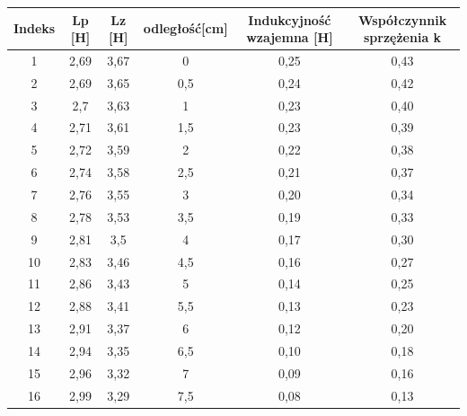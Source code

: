 \documentclass[a4paper,10pt,twoside]{article}
\begin{document}
\begin{table}[htb]
	\begin{tabular}{|c|c|c|c|c|c|}
		\hline
		Indeks & Lp {[}H{]} & Lz {[}H{]} & odległość[cm] & Indukcyjność wzajemna {[}H{]} & Współczynnik sprzężenia k \\ \hline
		1      & 2,69       & 3,67 & 0       & 0,25                          & 0,43                      \\ \hline
		2      & 2,69       & 3,65 & 0,5     & 0,24                          & 0,42                      \\ \hline
		3      & 2,7        & 3,63 & 1       & 0,23                          & 0,40                      \\ \hline
		4      & 2,71       & 3,61 & 1,5     & 0,23                          & 0,39                      \\ \hline
		5      & 2,72       & 3,59 & 2       & 0,22                          & 0,38                      \\ \hline
		6      & 2,74       & 3,58 & 2,5     & 0,21                          & 0,37                      \\ \hline
		7      & 2,76       & 3,55 & 3       & 0,20                          & 0,34                      \\ \hline
		8      & 2,78       & 3,53 & 3,5     & 0,19                          & 0,33                      \\ \hline
		9      & 2,81       & 3,5  & 4       & 0,17                          & 0,30                      \\ \hline
		10     & 2,83       & 3,46 & 4,5     & 0,16                          & 0,27                      \\ \hline
		11     & 2,86       & 3,43 & 5       & 0,14                          & 0,25                      \\ \hline
		12     & 2,88       & 3,41 & 5,5     & 0,13                          & 0,23                      \\ \hline
		13     & 2,91       & 3,37 & 6       & 0,12                          & 0,20                      \\ \hline
		14     & 2,94       & 3,35 & 6,5     & 0,10                          & 0,18                      \\ \hline
		15     & 2,96       & 3,32 & 7       & 0,09                          & 0,16                      \\ \hline
		16     & 2,99       & 3,29 & 7,5     & 0,08                          & 0,13                      \\ \hline

\end{tabular}
\end{table}
\end{document}
